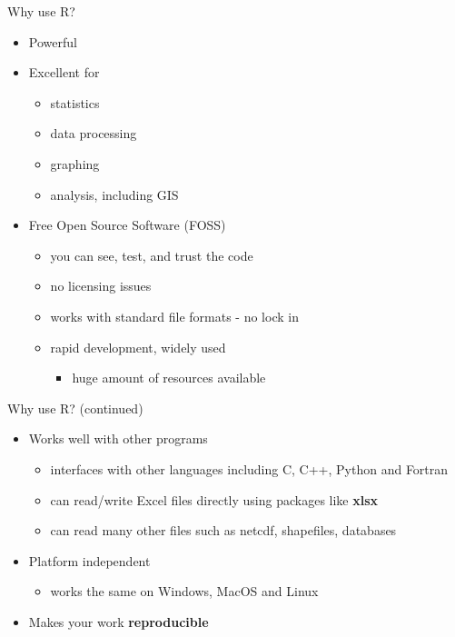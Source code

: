\documentclass[
  ignorenonframetext,
  aspectratio=169]{beamer}
\providecommand{\tightlist}{%
  \setlength{\itemsep}{0pt}\setlength{\parskip}{0pt}}
\begin{document}
\begin{frame}{Why use R?}
\protect\hypertarget{why-use-r}{}
\begin{itemize}
\tightlist
\item
  Powerful
\item
  Excellent for

  \begin{itemize}
  \tightlist
  \item
    statistics
  \item
    data processing
  \item
    graphing
  \item
    analysis, including GIS
  \end{itemize}
\item
  Free Open Source Software (FOSS)

  \begin{itemize}
  \tightlist
  \item
    you can see, test, and trust the code
  \item
    no licensing issues
  \item
    works with standard file formats - no lock in
  \item
    rapid development, widely used

    \begin{itemize}
    \tightlist
    \item
      huge amount of resources available
    \end{itemize}
  \end{itemize}
\end{itemize}
\end{frame}

\begin{frame}{Why use R? (continued)}
\protect\hypertarget{why-use-r-continued}{}
\begin{itemize}
\tightlist
\item
  Works well with other programs

  \begin{itemize}
  \tightlist
  \item
    interfaces with other languages including C, C++, Python and Fortran
  \item
    can read/write Excel files directly using packages like
    \textbf{xlsx}
  \item
    can read many other files such as netcdf, shapefiles, databases
  \end{itemize}
\item
  Platform independent

  \begin{itemize}
  \tightlist
  \item
    works the same on Windows, MacOS and Linux
  \end{itemize}
\item
  Makes your work \textbf{reproducible}
\end{itemize}
\end{frame}
\end{document}
